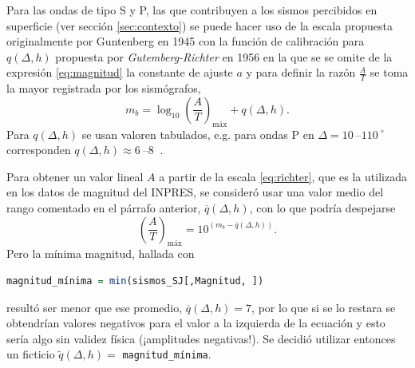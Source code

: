 \documentclass[a4paper]{report}
\begin{document}
Para las ondas de tipo S y P, las que contribuyen a los sismos percibidos en superficie (ver sección \ref{sec:contexto}) se puede hacer uso de la escala propuesta originalmente por Guntenberg en 1945 con la función de calibración para \(q(\Delta, h)\) propuesta por \emph{Gutemberg-Richter} en 1956 \cite[ecuación 4.18]{fowler_solid_1990} en la que se se omite de la expresión \ref{eq:magnitud} la constante de ajuste \(a\) y para definir la razón \(\frac{A}{T}\) se toma la mayor registrada por los sismógrafos,
\begin{equation}
	m_b = \log_{10} \left( \frac{A}{T} \right)_\text{máx} + q(\Delta, h).
	\label{eq:richter}
\end{equation}
Para \(q(\Delta, h)\) se usan valoren tabulados, e.g. para ondas P en \(\Delta = \SIrange{10}{110}{} ^\circ\) corresponden \(q(\Delta, h) \approx \SIrange{6}{8}{}\) \cite{willian_l_ellsworth_earthquake_1991}.

Para obtener un valor lineal \(A\) a partir de la escala \ref{eq:richter}, que es la utilizada en los datos de magnitud del INPRES, se consideró usar una valor medio del rango comentado en el párrafo anterior, \(\overline{q}(\Delta,h)\), con lo que podría despejarse
\begin{equation}
	\left( \frac{A}{T} \right)_\text{máx} = 10^{(m_b - \overline{q}(\Delta,h) )}.
	\label{eq:linealizacionMagnitud}
\end{equation}
Pero la mínima magnitud, hallada con
\begin{lstlisting}[breaklines=true, language=R]
	magnitud_mínima = min(sismos_SJ[,Magnitud, ])
\end{lstlisting}	
resultó ser menor que ese promedio, \(\overline{q}(\Delta,h) = 7\), por lo que si se lo restara se obtendrían valores negativos para el valor a la izquierda de la ecuación y esto sería algo sin validez física (¡amplitudes negativas!).
Se decidió utilizar entonces un ficticio \(\tilde{q}(\Delta,h) = \) \lstinline[language=R,breaklines=true,basicstyle=\ttfamily]'magnitud_mínima'.  
\end{document}
